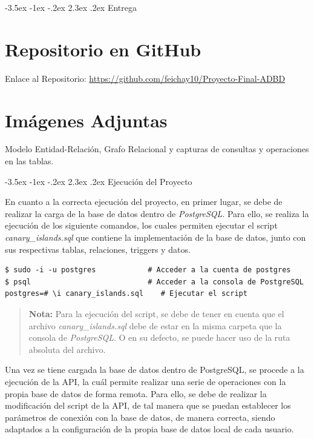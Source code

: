 \documentclass[11pt]{report}
\makeatletter
\renewcommand\chapter{\@startsection{chapter}{0}{\z@}%
    {-3.5ex \@plus -1ex \@minus -.2ex}%
    {2.3ex \@plus.2ex}%
    {\normalfont\Large\bfseries}}
\makeatother
\begin{document}
\chapter{Entrega}

\section{Repositorio en GitHub}
Enlace al Repositorio: \url{https://github.com/feichay10/Proyecto-Final-ADBD}

\section{Imágenes Adjuntas}
Modelo Entidad-Relación, Grafo Relacional y capturas de consultas y operaciones en las tablas.

\chapter{Ejecución del Proyecto}

En cuanto a la correcta ejecución del proyecto, en primer lugar, se debe de realizar la carga de la base de datos dentro de \emph{PostgreSQL}. Para ello, se realiza la ejecución de los siguiente comandos, los cuales permiten ejecutar el script \emph{canary\_islands.sql} que contiene la implementación de la base de datos, junto con sus respectivas tablas, relaciones, triggers y datos.

\begin{verbatim}
$ sudo -i -u postgres            # Acceder a la cuenta de postgres
$ psql                           # Acceder a la consola de PostgreSQL
postgres=# \i canary_islands.sql    # Ejecutar el script
\end{verbatim}

\begin{quote}
\textbf{Nota:} Para la ejecución del script, se debe de tener en cuenta que el archivo \emph{canary\_islands.sql} debe de estar en la misma carpeta que la consola de \emph{PostgreSQL}. O en su defecto, se puede hacer uso de la ruta absoluta del archivo.
\end{quote}

Una vez se tiene cargada la base de datos dentro de PostgreSQL, se procede a la ejecución de la API, la cuál permite realizar una serie de operaciones con la propia base de datos de forma remota. Para ello, se debe de realizar la modificación del script de la API, de tal manera que se puedan establecer los parámetros de conexión con la base de datos, de manera correcta, siendo adaptados a la configuración de la propia base de datos local de cada usuario.
\end{document}
